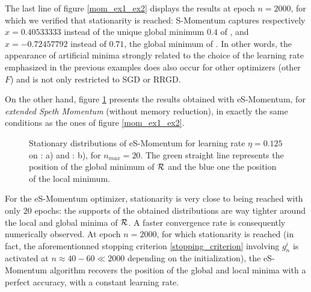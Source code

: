 \documentclass[article,authoryear,jmlmc]{beg_32}             %
\begin{document}
  The last line of figure \ref{mom_ex1_ex2} displays the results at epoch $n=2000$, for which we verified that stationarity is reached:  S-Momentum captures respectively
  $x=0.40533333$ instead of the unique global minimum $0.4$ of \exOne, 
  and $x=-0.72457792$ instead of $0.71$, the global minimum of \exTwo. 
  In other words, the appearance of artificial minima strongly related to the choice of the learning rate emphasized in the previous examples does also occur for other optimizers
  (other $F$) and is not only restricted to SGD or RRGD. 

  On the other hand, figure \ref{speth_mom_ex1_ex2} presents the results obtained with eS-Momentum, for {\em extended Speth Momentum} {(without memory reduction)}, in exactly the same conditions as the ones of figure \ref{mom_ex1_ex2}. 
\begin{figure}[!h]
	\centering
	\scalebox{0.60}{}
	\scalebox{0.60}{}
        \caption{Stationary distributions of eS-Momentum for learning rate $\eta=0.125$ on \exOne: a) and \exTwo: b), for $n_{max}=20$. The green straight line represents the position of the global minimum of $\mathcal{R}$ and the blue one the position of the local minimum.}
	\label{speth_mom_ex1_ex2}
\end{figure}
For the eS-Momentum optimizer, stationarity is very close to being reached with only $20$ epochs: the supports of the obtained distributions are way tighter around the local and
global minima of $\mathcal{R}$. A faster convergence rate is consequently numerically observed.  
  At epoch $n=2000$, for which stationarity is reached (in fact, the aforementionned stopping criterion \eqref{stopping_criterion} involving $g_n^i$ is activated at $n\approx 40 - 60 \ll 2000$ depending on the
  initialization), the eS-Momentum algorithm recovers the 
  position of the global and local minima with a perfect accuracy, with a constant learning rate. 
\end{document}
